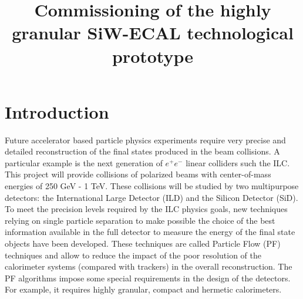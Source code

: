 \documentclass[a4paper,11pt]{article}
\title{\boldmath Commissioning of the highly granular SiW-ECAL technological prototype}
\begin{document}
\maketitle
\flushbottom


\section{Introduction}

Future accelerator based particle physics experiments
require very precise and detailed reconstruction of the final states produced
in the beam collisions. A particular example is the next generation of $e^{+}e^{-}$
linear colliders such the ILC\cite{Behnke:2013xla,Baer:2013cma,Adolphsen:2013jya,Adolphsen:2013kya,Behnke:2013lya}.
This project will provide collisions of polarized beams with center-of-mass energies of 250 GeV - 1 TeV.
These collisions will be studied by two multipurpose detectors:
the International Large Detector (ILD) and the Silicon Detector (SiD)\cite{Behnke:2013lya}.
To meet the precision levels required by the ILC %
physics goals,
new techniques relying on single particle separation to make possible the choice of the best information available
in the full detector to measure the energy of the final state objects have been developed.
These techniques are called Particle Flow (PF) techniques \cite{Brient:2002gh,Morgunov:2004ed,Sefkow:2015hna}
and allow to reduce the impact of the poor resolution of the calorimeter systems (compared with trackers) in the overall reconstruction.
The PF algorithms impose some special requirements in the design of the detectors.
For example, it requires highly granular, compact
and hermetic calorimeters.
\end{document}
